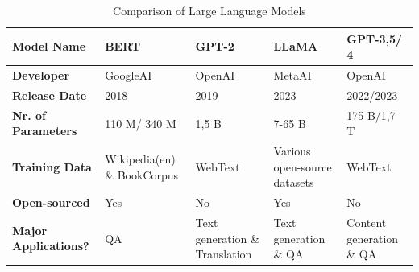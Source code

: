 \documentclass[runningheads]{llncs}
\begin{document}
\begin{table}[h!]
  \centering
  \begin{tabular}{| p{4cm} | p{2cm} | p{2cm} | p{2cm} | p{2cm} |}
  \hline
  \textbf{Model Name} & BERT & GPT-2 & LLaMA & GPT-3,5/ 4 \\
  \hline
  \textbf{Developer} & GoogleAI & OpenAI & MetaAI & OpenAI \\
  \hline
  \textbf{Release Date} & 2018 & 2019 & 2023 & 2022/2023 \\
  \hline
  \textbf{Nr. of Parameters} & 110 M/ 340 M & 1,5 B & 7-65 B & 175 B/1,7 T \\
  \hline
  \textbf{Training Data} & Wikipedia(en) \& BookCorpus & WebText & Various open-source datasets & WebText \\
  \hline
  \textbf{Open-sourced} & Yes & No & Yes & No \\
  \hline
  \textbf{Major Applications?} & QA & Text generation \& Translation & Text generation \& QA & Content generation \& QA \\
  \hline
  \end{tabular}
  \caption{Comparison of Large Language Models}
  \label{table:comparison}
  \end{table}
\end{document}
